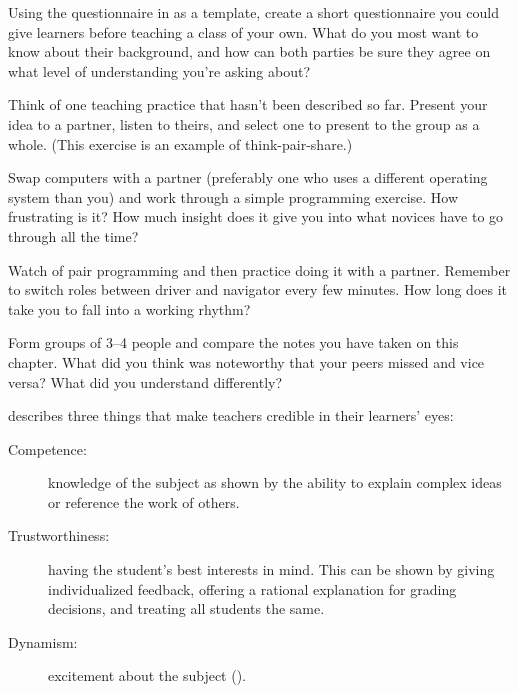

Using the questionnaire in  as a template,
create a short questionnaire you could give learners before teaching a class of your own.
What do you most want to know about their background,
and how can both parties be sure they agree on what level of understanding you're asking about?


Think of one teaching practice that hasn't been described so far.
Present your idea to a partner,
listen to theirs,
and select one to present to the group as a whole.
(This exercise is an example of think-pair-share.)


Swap computers with a partner
(preferably one who uses a different operating system than you)
and work through a simple programming exercise.
How frustrating is it?
How much insight does it give you into what novices have to go through all the time?


Watch  of pair programming
and then practice doing it with a partner.
Remember to switch roles between driver and navigator every few minutes.
How long does it take you to fall into a working rhythm?


Form groups of 3--4 people
and compare the notes you have taken on this chapter.
What did you think was noteworthy that your peers missed and vice versa?
What did you understand differently?


\cite{Fink2013} describes three things
that make teachers credible in their learners' eyes:

\begin{description}

\item[Competence:]
  knowledge of the subject
  as shown by the ability to explain complex ideas
  or reference the work of others.

\item[Trustworthiness:]
  having the student's best interests in mind.
  This can be shown by giving individualized feedback,
  offering a rational explanation for grading decisions,
  and treating all students the same.

\item[Dynamism:]
  excitement about the subject ().

\end{description}

